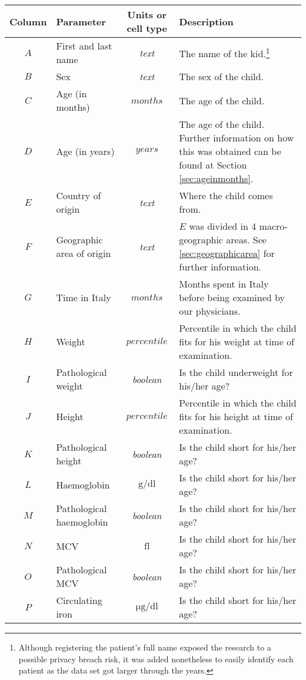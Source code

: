 \begin{footnotesize}
	\centering
	\begin{longtable}{C{.09\mylength} p{.25\mylength} C{.20\mylength} p{.40\mylength}}
	Column & Parameter & Units or cell type & Description\\
	\hline
	$A$ & First and last name & \textit{text} & The name of the kid.\footnote{Although registering the patient's full name exposed the research to a possible privacy breach risk, it was added nonetheless to easily identify each patient as the data set got larger through the years.}\\
	$B$ & Sex & \textit{text} & The sex of the child.\\
	$C$ & Age (in months) & $months$ & The age of the child.\\
	$D$ & Age (in years) & $years$ & The age of the child. Further information on how this was obtained can be found at Section \ref{sec:ageinmonths}.\\
	$E$ & Country of origin & \textit{text} & Where the child comes from.\\
	$F$ & Geographic area of origin & \textit{text} & $E$ was divided in 4 macro-geographic areas. See \ref{sec:geographicarea} for further information.\\
	$G$ & Time in Italy & $months$ &  Months spent in Italy before being examined by our physicians.\\
	$H$ & Weight & $percentile$ & Percentile in which the child fits for his weight at time of examination.\\
	$I$ & Pathological weight & \textit{boolean} & Is the child underweight for his/her age?\\
	$J$ & Height & $percentile$ & Percentile in which the child fits for his height at time of examination.\\
	$K$ & Pathological height & \textit{boolean} & Is the child short for his/her age?\\
	$L$ & Haemoglobin & $\si{\gram}/\si{\deci\litre}$ & Is the child short for his/her age?\\
	$M$ & Pathological haemoglobin & \textit{boolean} & Is the child short for his/her age?\\
	$N$ & MCV & $\si{\femto\litre}$ & Is the child short for his/her age?\\
	$O$ & Pathological MCV & \textit{boolean} & Is the child short for his/her age?\\
	$P$ & Circulating iron & $\si{\micro\gram}/\si{\deci\litre}$ & Is the child short for his/her age?\\

\end{longtable}
\end{footnotesize}
